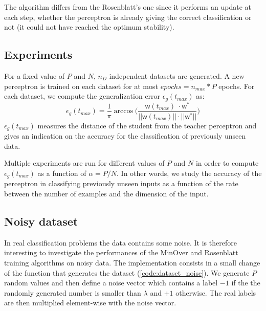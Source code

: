 The algorithm differs from the Rosenblatt's one since it performs an update at each step, whether the perceptron is already giving the correct classification or not (it could not have reached the optimum stability).

\subsection{Experiments}
For a fixed value of $P$ and $N$, $n_D$ independent datasets are generated.
A new perceptron is trained on each dataset for at most $epochs = n_{max} * P$ epochs.
For each dataset, we compute the generalization error $\epsilon_g(t_{max})$ as:
\begin{equation}
    \epsilon_g(t_{max}) = \frac{1}{\pi} \arccos \bigg(\frac{\bm{\mathsf{w}}(t_{max})\;\cdotp \bm{\mathsf{w}}^*}{|| \bm{\mathsf{w}}(t_{max}) || \cdot || \bm{\mathsf{w}}^* ||} \bigg)
    \label{eq:generalization_error}
\end{equation}
$\epsilon_g(t_{max})$ measures the distance of the student from the teacher perceptron and gives an indication on the accuracy for the classification of previously unseen data.

Multiple experiments are run for different values of $P$ and $N$ in order to compute $\epsilon_g(t_{max})$ as a function of $\alpha = P / N$.
In other words, we study the accuracy of the perceptron in classifying previously unseen inputs as a function of the rate between the number of examples and the dimension of the input.

\subsection{Noisy dataset}
In real classification problems the data contains some noise.
It is therefore interesting to investigate the performances of the MinOver and Rosenblatt training algorithms on noisy data.
The implementation consists in a small change of the function that generates the dataset (\cref{code:dataset_noise}).
We generate $P$ random values and then define a noise vector which contains a label $-1$ if the the randomly generated number is smaller than $\lambda$ and $+1$ otherwise.
The real labels are then multiplied element-wise with the noise vector.
